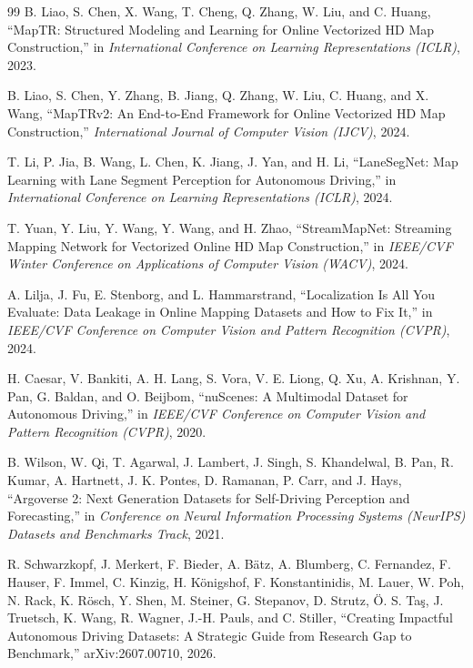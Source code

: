 \documentclass[11pt]{article}
\begin{document}
\begin{thebibliography}{99}
B. Liao, S. Chen, X. Wang, T. Cheng, Q. Zhang, W. Liu, and C. Huang,
``MapTR: Structured Modeling and Learning for Online Vectorized HD Map Construction,''
in \textit{International Conference on Learning Representations (ICLR)}, 2023.

B. Liao, S. Chen, Y. Zhang, B. Jiang, Q. Zhang, W. Liu, C. Huang, and X. Wang,
``MapTRv2: An End-to-End Framework for Online Vectorized HD Map Construction,''
\textit{International Journal of Computer Vision (IJCV)}, 2024.

T. Li, P. Jia, B. Wang, L. Chen, K. Jiang, J. Yan, and H. Li,
``LaneSegNet: Map Learning with Lane Segment Perception for Autonomous Driving,''
in \textit{International Conference on Learning Representations (ICLR)}, 2024.

T. Yuan, Y. Liu, Y. Wang, Y. Wang, and H. Zhao,
``StreamMapNet: Streaming Mapping Network for Vectorized Online HD Map Construction,''
in \textit{IEEE/CVF Winter Conference on Applications of Computer Vision (WACV)}, 2024.

A. Lilja, J. Fu, E. Stenborg, and L. Hammarstrand,
``Localization Is All You Evaluate: Data Leakage in Online Mapping Datasets and How to Fix It,''
in \textit{IEEE/CVF Conference on Computer Vision and Pattern Recognition (CVPR)}, 2024.


H. Caesar, V. Bankiti, A. H. Lang, S. Vora, V. E. Liong, Q. Xu, A. Krishnan, Y. Pan, G. Baldan, and O. Beijbom,
``nuScenes: A Multimodal Dataset for Autonomous Driving,''
in \textit{IEEE/CVF Conference on Computer Vision and Pattern Recognition (CVPR)}, 2020.


B. Wilson, W. Qi, T. Agarwal, J. Lambert, J. Singh, S. Khandelwal, B. Pan, R. Kumar, A. Hartnett, J. K. Pontes, D. Ramanan, P. Carr, and J. Hays,
``Argoverse 2: Next Generation Datasets for Self-Driving Perception and Forecasting,''
in \textit{Conference on Neural Information Processing Systems (NeurIPS) Datasets and Benchmarks Track}, 2021.


R. Schwarzkopf, J. Merkert, F. Bieder, A. B\"atz, A. Blumberg, C. Fernandez, F. Hauser, F. Immel, C. Kinzig, H. K\"onigshof, F. Konstantinidis, M. Lauer, W. Poh, N. Rack, K. R\"osch, Y. Shen, M. Steiner, G. Stepanov, D. Strutz, \"O. S. Ta\c{s}, J. Truetsch, K. Wang, R. Wagner, J.-H. Pauls, and C. Stiller,
``Creating Impactful Autonomous Driving Datasets: A Strategic Guide from Research Gap to Benchmark,''
arXiv:2607.00710, 2026.


\end{thebibliography}
\end{document}
